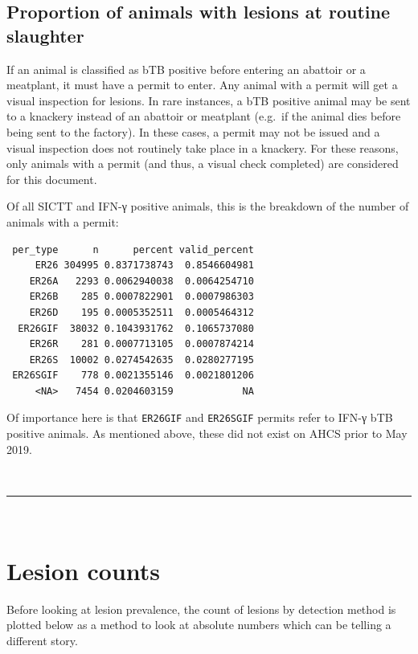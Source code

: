 \documentclass[
  letterpaper,
  DIV=11,
  numbers=noendperiod]{scrreprt}
\begin{document}
\subsection{Proportion of animals with lesions at routine
slaughter}\label{proportion-of-animals-with-lesions-at-routine-slaughter}

If an animal is classified as bTB positive before entering an abattoir
or a meatplant, it must have a permit to enter. Any animal with a permit
will get a visual inspection for lesions. In rare instances, a bTB
positive animal may be sent to a knackery instead of an abattoir or
meatplant (e.g.~if the animal dies before being sent to the factory). In
these cases, a permit may not be issued and a visual inspection does not
routinely take place in a knackery. For these reasons, only animals with
a permit (and thus, a visual check completed) are considered for this
document.

Of all SICTT and IFN-γ positive animals, this is the breakdown of the
number of animals with a permit:

\begin{verbatim}
 per_type      n      percent valid_percent
     ER26 304995 0.8371738743  0.8546604981
    ER26A   2293 0.0062940038  0.0064254710
    ER26B    285 0.0007822901  0.0007986303
    ER26D    195 0.0005352511  0.0005464312
  ER26GIF  38032 0.1043931762  0.1065737080
    ER26R    281 0.0007713105  0.0007874214
    ER26S  10002 0.0274542635  0.0280277195
 ER26SGIF    778 0.0021355146  0.0021801206
     <NA>   7454 0.0204603159            NA
\end{verbatim}

Of importance here is that \texttt{ER26GIF} and \texttt{ER26SGIF}
permits refer to IFN-γ bTB positive animals. As mentioned above, these
did not exist on AHCS prior to May 2019.

\(~\) \(~\)

\begin{center}\rule{0.5\linewidth}{0.5pt}\end{center}

\(~\) \(~\)

\newpage

\section{Lesion counts}\label{lesion-counts}

Before looking at lesion prevalence, the count of lesions by detection
method is plotted below as a method to look at absolute numbers which
can be telling a different story.
\end{document}
